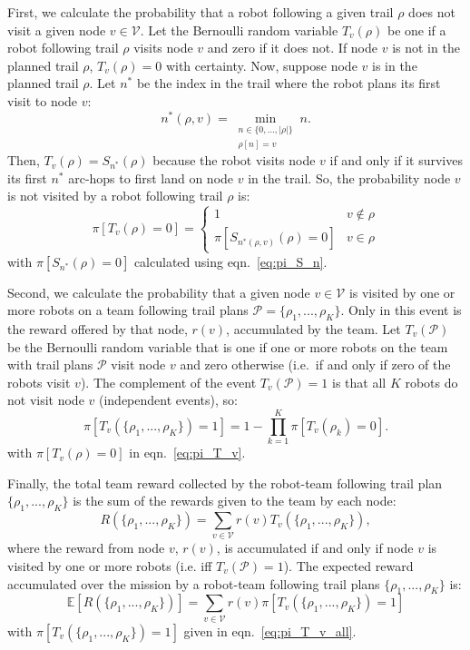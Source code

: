 \documentclass[fleqn,10pt,lineno]{wlpeerj}
\begin{document}
First, we calculate the probability that a robot following a given trail $\rho$ does not visit a given node $v\in \mathcal{V}$.
Let the Bernoulli random variable $T_v(\rho)$ be one if a robot following trail $\rho$ visits node $v$ and zero if it does not.
If node $v$ is not in the planned trail $\rho$, $T_v(\rho)=0$ with certainty. 
Now, suppose node $v$ is in the planned trail $\rho$. Let $n^*$ be the index in the trail where the robot plans its first visit to node $v$:
\begin{equation}
n^*(\rho, v) = \min_{
	\substack{n \in \{0, ..., \lvert \rho \rvert\} \\ \rho[n] = v}
} n.
\end{equation}
Then, $T_v(\rho)=S_{n^*}(\rho)$ because the robot visits node $v$ if and only if it survives its first $n^*$ arc-hops to first land on node $v$ in the trail. 
So, the probability node $v$ is not visited by a robot following trail $\rho$ is:
\begin{equation}
	\pi[T_v(\rho) = 0] = 
	\begin{cases}
		1 & v\notin \rho\\
		 \pi [S_{n^*(\rho, v)}(\rho)=0 ] & v \in \rho
	\end{cases}
	 \label{eq:pi_T_v}
\end{equation}
with $\pi[S_{n^*}(\rho)=0]$ calculated using eqn.~\ref{eq:pi_S_n}.

Second, we calculate the probability that a given node $v\in\mathcal{V}$ is visited by one or more robots on a team following trail plans $\mathcal{P}=\{\rho_1, ..., \rho_K\}$. Only in this event is the reward offered by that node, $r(v)$, accumulated by the team.
Let $T_v(\mathcal{P})$ be the Bernoulli random variable that is one if one or more robots on the team with trail plans $\mathcal{P}$ visit node $v$ and zero otherwise (i.e.\ if and only if zero of the robots visit $v$).
The complement of the event $T_v(\mathcal{P})=1$ is that all $K$ robots do not visit node $v$ (independent events), so:
\begin{equation}
	\pi [T_v( \{\rho_1, ..., \rho_K\} ) = 1] = 
	1 - \prod_{k=1}^K \pi[T_v(\rho_k)=0].
	\label{eq:pi_T_v_all}
\end{equation} 
with $\pi[T_v(\rho) = 0]$ in eqn.~\ref{eq:pi_T_v}.

Finally, the total team reward collected by the robot-team following trail plan $\{\rho_1, ..., \rho_K\}$ is the sum of the rewards given to the team by each node:
\begin{equation}
R(\{\rho_1,...,\rho_K\}) = \sum_{v\in\mathcal{V}} r(v)  T_v(\{\rho_1, ..., \rho_K\}),
\end{equation} where the reward from node $v$, $r(v)$, is accumulated if and only if node $v$ is visited by one or more robots (i.e. iff $T_v(\mathcal{P})=1$).
The expected reward accumulated over the mission by a robot-team following trail plans $\{\rho_1, ..., \rho_K\}$ is:
\begin{equation}
	\mathbb{E}[R(\{\rho_1,...,\rho_K\})]= \sum_{v\in\mathcal{V}} r(v) \pi[T_v(\{\rho_1, ..., \rho_K\}) = 1] \label{eq:formula_obj1}
\end{equation}
with $ \pi[T_v(\{\rho_1, ..., \rho_K\}) = 1]$ given in eqn.~\ref{eq:pi_T_v_all}.
\end{document}
